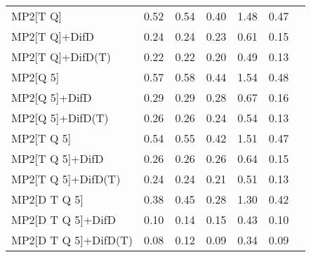 \begin{table}
\begin{tabular}{l l l l l l l }
    MP2[T Q] & 0.52 & 0.54 & 0.40 & 1.48 & 0.47 \\ 
    MP2[T Q]+DifD & 0.24 & 0.24 & 0.23 & 0.61 & 0.15 \\ 
    MP2[T Q]+DifD(T) & 0.22 & 0.22 & 0.20 & 0.49 & 0.13 \\ 
    MP2[Q 5] & 0.57 & 0.58 & 0.44 & 1.54 & 0.48 \\ 
    MP2[Q 5]+DifD & 0.29 & 0.29 & 0.28 & 0.67 & 0.16 \\ 
    MP2[Q 5]+DifD(T) & 0.26 & 0.26 & 0.24 & 0.54 & 0.13 \\ 
    MP2[T Q 5] & 0.54 & 0.55 & 0.42 & 1.51 & 0.47 \\ 
    MP2[T Q 5]+DifD & 0.26 & 0.26 & 0.26 & 0.64 & 0.15 \\ 
    MP2[T Q 5]+DifD(T) & 0.24 & 0.24 & 0.21 & 0.51 & 0.13 \\ 
    MP2[D T Q 5] & 0.38 & 0.45 & 0.28 & 1.30 & 0.42 \\ 
    MP2[D T Q 5]+DifD & 0.10 & 0.14 & 0.15 & 0.43 & 0.10 \\ 
    MP2[D T Q 5]+DifD(T) & 0.08 & 0.12 & 0.09 & 0.34 & 0.09 \\ 
    \hline
  \end{tabular}
\end{table}
